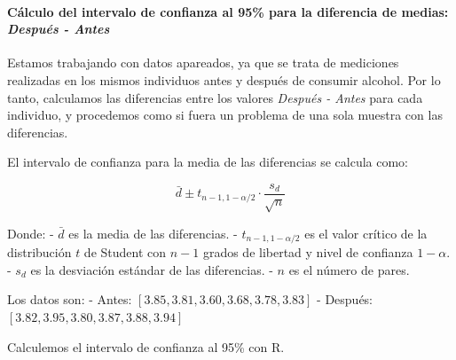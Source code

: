 \documentclass[
]{article}
\newenvironment{Shaded}{\begin{snugshade}}{\end{snugshade}}
\newcommand{\AttributeTok}[1]{\textcolor[rgb]{0.13,0.29,0.53}{#1}}
\newcommand{\CommentTok}[1]{\textcolor[rgb]{0.56,0.35,0.01}{\textit{#1}}}
\newcommand{\ConstantTok}[1]{\textcolor[rgb]{0.56,0.35,0.01}{#1}}
\newcommand{\FloatTok}[1]{\textcolor[rgb]{0.00,0.00,0.81}{#1}}
\newcommand{\FunctionTok}[1]{\textcolor[rgb]{0.13,0.29,0.53}{\textbf{#1}}}
\newcommand{\NormalTok}[1]{#1}
\newcommand{\OtherTok}[1]{\textcolor[rgb]{0.56,0.35,0.01}{#1}}
\newcommand{\SpecialCharTok}[1]{\textcolor[rgb]{0.81,0.36,0.00}{\textbf{#1}}}
\begin{document}
\paragraph{\texorpdfstring{Cálculo del intervalo de confianza al 95\% para la diferencia de medias: \emph{Después - Antes}}{Cálculo del intervalo de confianza al 95\% para la diferencia de medias: Después - Antes}}\label{cuxe1lculo-del-intervalo-de-confianza-al-95-para-la-diferencia-de-medias-despuuxe9s---antes}

Estamos trabajando con datos apareados, ya que se trata de mediciones realizadas en los mismos individuos antes y después de consumir alcohol. Por lo tanto, calculamos las diferencias entre los valores \emph{Después - Antes} para cada individuo, y procedemos como si fuera un problema de una sola muestra con las diferencias.

El intervalo de confianza para la media de las diferencias se calcula como:

\[ \bar{d} \pm t_{n-1, 1-\alpha/2} \cdot \frac{s_d}{\sqrt{n}} \]

Donde:
- \(\bar{d}\) es la media de las diferencias.
- \(t_{n-1, 1-\alpha/2}\) es el valor crítico de la distribución \(t\) de Student con \(n-1\) grados de libertad y nivel de confianza \(1-\alpha\).
- \(s_d\) es la desviación estándar de las diferencias.
- \(n\) es el número de pares.

Los datos son:
- Antes: \([3.85, 3.81, 3.60, 3.68, 3.78, 3.83]\)
- Después: \([3.82, 3.95, 3.80, 3.87, 3.88, 3.94]\)

Calculemos el intervalo de confianza al 95\% con R.

\begin{Shaded}
\end{Shaded}
\end{document}
